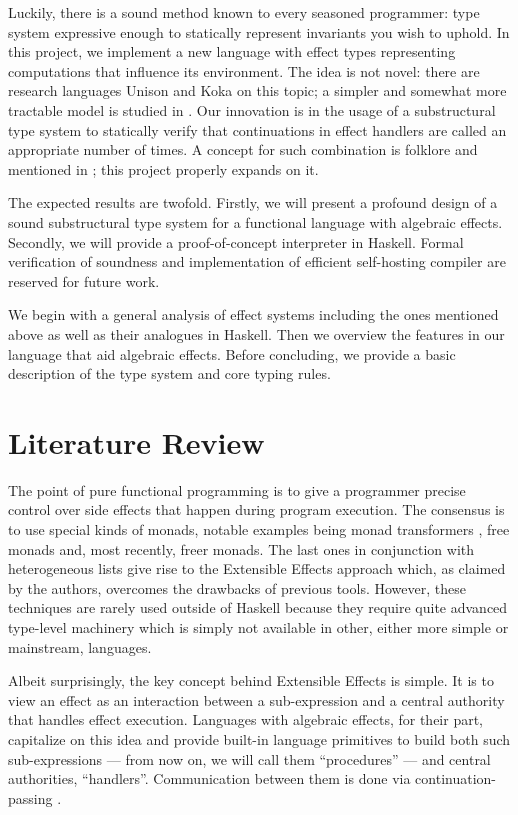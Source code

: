 \documentclass[conference]{IEEEtran}
\begin{document}
Luckily, there is a sound method known to every seasoned programmer: type system
expressive enough to statically represent invariants you wish to uphold. In this
project, we implement a new language with effect types representing computations
that influence its environment. The idea is not novel: there are research
languages Unison \cite{unison} and Koka \cite{koka} on this topic; a simpler and
somewhat more tractable model is studied in \cite{bauer}. Our innovation is in
the usage of a substructural type system to statically verify that continuations
in effect handlers are called an appropriate number of times. A concept for such
combination is folklore and mentioned in \cite{folklore}; this project properly
expands on it.

The expected results are twofold. Firstly, we will present a profound design of
a sound substructural type system for a functional language with algebraic
effects. Secondly, we will provide a proof-of-concept interpreter in Haskell.
Formal verification of soundness and implementation of efficient self-hosting
compiler are reserved for future work.

We begin with a general analysis of effect systems including the ones mentioned
above as well as their analogues in Haskell. Then we overview the features in
our language that aid algebraic effects. Before concluding, we provide a basic
description of the type system and core typing rules.

\section{Literature Review}

The point of pure functional programming is to give a programmer precise control
over side effects that happen during program execution. The consensus is to use
special kinds of monads, notable examples being monad transformers \cite{mtl},
free monads \cite{free} and, most recently, freer monads. The last ones in
conjunction with heterogeneous lists give rise to the Extensible Effects
approach \cite{exteff} which, as claimed by the authors, overcomes the drawbacks
of previous tools. However, these techniques are rarely used outside of Haskell
because they require quite advanced type-level machinery which is simply not
available in other, either more simple or mainstream, languages.

Albeit surprisingly, the key concept behind Extensible Effects is simple. It is
to view an effect as an interaction between a sub-expression and a central
authority that handles effect execution. Languages with algebraic effects, for
their part, capitalize on this idea and provide built-in language primitives to
build both such sub-expressions --- from now on, we will call them
``procedures'' --- and central authorities, ``handlers''. Communication between
them is done via continuation-passing \cite{algeff}.
\end{document}
